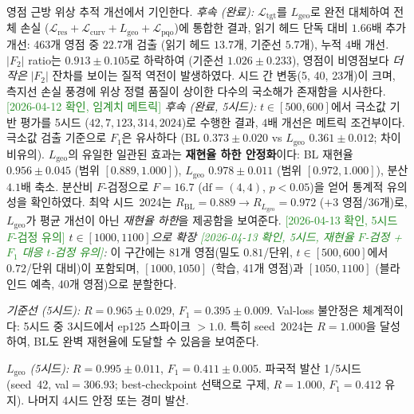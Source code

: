 \documentclass[11pt, a4paper]{article}
\theoremstyle{definition}
\theoremstyle{plain}
\newcommand{\Lpqo}{\mathcal{L}_{\mathrm{pqo}}}
\newcommand{\Ltgt}{\mathcal{L}_{\mathrm{tgt}}}
\newcommand{\Lcurv}{\mathcal{L}_{\mathrm{curv}}}
\newcommand{\Lres}{\mathcal{L}_{\mathrm{res}}}
\begin{document}
\begin{itemize}
        영점 근방 위상 추적 개선에서 기인한다.
        \emph{후속 (완료):} $\Ltgt$를 $L_{\mathrm{geo}}$로 완전
        대체하여 전체 손실
        ($\Lres+\Lcurv+L_{\mathrm{geo}}+\Lpqo$)에 통합한 결과,
        읽기 헤드 단독 대비 $1.66$배 추가 개선:
        463개 영점 중 $22.7$개 검출 (읽기 헤드 $13.7$개,
        기준선 $5.7$개), 누적 $4$배 개선.
        $|F_2|$ ratio는 $0.913\pm0.105$로 하락하여
        (기준선 $1.026\pm0.233$), 영점이 비영점보다
        \emph{더 작은} $|F_2|$ 잔차를 보이는 질적 역전이
        발생하였다. 시드 간 변동(5, 40, 23개)이 크며,
        측지선 손실 풍경에 위상 정렬 품질이 상이한
        다수의 국소해가 존재함을 시사한다.
        \textcolor{ForestGreen}{[2026-04-12 확인, 임계치 메트릭]}
        \emph{후속 (완료, 5시드):}
        $t\in[500,600]$에서 극소값 기반 평가를 5시드
        ($42, 7, 123, 314, 2024$)로 수행한 결과,
        $4$배 개선은 메트릭 조건부이다.
        극소값 검출 기준으로 $F_1$은 유사하다
        (BL $0.373\pm0.020$ vs $L_{\mathrm{geo}}$
        $0.361\pm0.012$; 차이 비유의).
        $L_{\mathrm{geo}}$의 유일한 일관된 효과는
        \textbf{재현율 하한 안정화}이다:
        BL 재현율 $0.956\pm0.045$ (범위 $[0.889,1.000]$),
        $L_{\mathrm{geo}}$ $0.978\pm0.011$
        (범위 $[0.972,1.000]$), 분산 $4.1$배 축소.
        분산비 $F$-검정으로 $F=16.7$ ($\mathrm{df}=(4,4)$,
        $p<0.05$)을 얻어 통계적 유의성을 확인하였다.
        최악 시드~2024는
        $R_{\mathrm{BL}}=0.889\to R_{L_{\mathrm{geo}}}=0.972$
        ($+3$ 영점/36개)로, $L_{\mathrm{geo}}$가 평균 개선이
        아닌 \emph{재현율 하한}을 제공함을 보여준다.
        \textcolor{ForestGreen}{[2026-04-13 확인, 5시드
        $F$-검정 유의]}
        \emph{$t\in[1000{,}1100]$으로 확장
        \textcolor{ForestGreen}{[2026-04-13 확인, 5시드,
        재현율 $F$-검정 + $F_1$ 대응 $t$-검정 유의]}:}
        이 구간에는 81개 영점(밀도 $0.81$/단위,
        $t\in[500,600]$에서 $0.72$/단위 대비)이 포함되며,
        $[1000,1050]$ (학습, 41개 영점)과 $[1050,1100]$
        (블라인드 예측, 40개 영점)으로 분할한다.

        \smallskip\noindent
        \emph{기준선 (5시드):}
        $R{=}0.965\pm0.029$, $F_1{=}0.395\pm0.009$.
        Val-loss 불안정은 체계적이다: 5시드 중 3시드에서
        ep125 스파이크 $>1.0$.
        특히 seed~2024는 $R{=}1.000$을 달성하여, BL도
        완벽 재현율에 도달할 수 있음을 보여준다.

        \smallskip\noindent
        \emph{$L_{\mathrm{geo}}$ (5시드):}
        $R{=}0.995\pm0.011$, $F_1{=}0.411\pm0.005$.
        파국적 발산 1/5시드 (seed~42, val$=306.93$;
        best-checkpoint 선택으로 구제,
        $R{=}1.000$, $F_1{=}0.412$ 유지).
        나머지 4시드 안정 또는 경미 발산.


\end{itemize}
\end{document}
